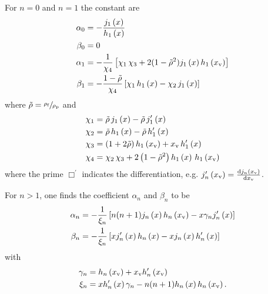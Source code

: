 For $n=0$ and $n=1$ the constant are
\begin{subequations}
\begin{align}
  \alpha_{0} & = -\frac{j_{1}\left(x\right)}{h_{1}\left(x\right)} \\
  \beta_{0} & = 0 \\
  \alpha_{1} & = - \frac{1}{\chi_{4}} \left[ \chi_{1}\,\chi_{3} + 
  2(1-\tilde{\rho}^{2})j_{1}\left(x\right)h_{1}\left(x_{\mathrm{v}}\right) \right]
    \label{eq:TA-alpha-one}\\
    \beta_{1} &= - \frac{1-\tilde{\rho}}{\chi_{4}} \left[ \chi_{1}\,h_{1}\left(x\right) - 
    \chi_{2}\,j_{1}\left(x\right) \right]
    \label{eq:TA-beta-one}
\end{align}
\end{subequations}
where $\tilde{\rho} = \sfrac{\rho_{\mathrm{f}}}{\rho_{\mathrm{p}}}$ and
\begin{subequations}
\begin{align}
\chi_{1} & = \tilde{\rho}\,j_{1}\left(x\right) - \tilde{\rho}\,j^{\prime}_{1}\left(x\right)
\label{eq:TA-chi-one} \\
\chi_{2} & = \tilde{\rho}\,h_{1}\left(x\right) - \tilde{\rho}\,h^{\prime}_{1}\left(x\right)
\label{eq:TA-chi-two} \\
\chi_{3} & = \left( 1 + 2 \tilde{\rho}\right)h_{1}\left(x_{\mathrm{v}}\right) + 
x_{\mathrm{v}}\,h^{\prime}_{1}\left(x\right)
\label{eq:TA-chi-three} \\
\chi_{4} & = \chi_{2}\,\chi_{3} + 2\left( 1 - \tilde{\rho}^{2} \right) 
h_{1}\left(x\right)\,h_{1}\left(x_{\mathrm{v}}\right)
\label{eq:TA-chi-four}
\end{align}
\end{subequations}
where the prime $\Box^{\prime}$ indicates the differentiation, e.g. 
$j^{\prime}_{n}\left(x_{\mathrm{v}}\right)=\dv{j_{n}\left(x_{\mathrm{v}}\right)}{x_{\mathrm{v}}}$.

For $n > 1$, one finds the coefficient $\alpha_{n}$ and $\beta_{n}$ to be
\begin{subequations}
\begin{align}
  \alpha_{n} & =
  - \frac{1}{\xi_{n}} \left[
    n(n+1)j_{n}\left(x\right)h_{n}\left(x_{\mathrm{v}}\right) - x \gamma_{n}j^{\prime}_{n}\left(x\right)
  \right]
  \label{eq:TA-alpha-n}\\
    \beta_{n} &= - \frac{1}{\xi_{n}} \left[
      xj^{\prime}_{n}\left(x\right)h_{n}\left(x\right) - xj_{n}\left(x\right)h^{\prime}_{n}\left(x\right)
    \right]
    \label{eq:TA-beta-n}
\end{align}
\end{subequations}
with
\begin{subequations}
\begin{align}
  \gamma_{n} & =
  h_{n}\left(x_{\mathrm{v}}\right)+x_{\mathrm{v}}h^{\prime}_{n}\left(x_{\mathrm{v}}\right)
  \label{eq:TA-gamma-n}\\
  \xi_{n} &= xh^{\prime}_{n}\left(x\right)\gamma_{n} - n(n+1)h_{n}\left(x\right)h_{n}\left(x_{\mathrm{v}}\right).
    \label{eq:TA-xi-n}
\end{align}
\end{subequations}

